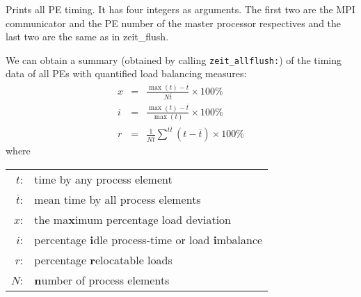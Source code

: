  Prints all PE timing.
It has four integers as arguments.
The first two are the MPI communicator and the PE number of the master
processor respectives and the last two are the same as in zeit\_flush.

\newcommand{\tb}{\overline{t}}

We can obtain a summary (obtained by calling {\tt zeit\_allflush:}) of the 
timing data of all PEs with quantified load balancing measures:
%
\begin{eqnarray*}
x &=& \frac{\max(t) - \tb}{N\tb}           \times 100\% \\
i &=& \frac{\max(t) - \tb}{\max(t)}        \times 100\% \\
r &=& \frac{1}{N\tb} \sum^{t\tb}{(t-\tb)} \times 100\%
\end{eqnarray*}
%
where
%
\begin{center}
\begin{tabular}{rl}
$t$: & time by any process element			\\
$\tb$: & mean time by all process elements		\\
$x$: & the ma{\bf x}imum percentage load deviation	\\
$i$: & percentage {\bf i}dle process-time or load {\bf i}mbalance \\
$r$: & percentage {\bf r}elocatable loads		\\
$N$: & {\bf n}umber of process elements
\end{tabular}
\end{center}
 
